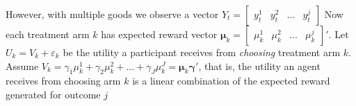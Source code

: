 \documentclass{article}
\begin{document}
However, with multiple goods we observe a  vector  $Y_t = \begin{bmatrix} y^1_t & y^2_t & ... & y^j_t\end{bmatrix}$
Now each treatment arm $k$ has expected reward vector $\bm{\mu}_k = \begin{bmatrix}
    \mu^1_k & \mu^2_k & ... & \mu^j_k
\end{bmatrix}'$. Let $U_k = V_k + \varepsilon_k$ be the utility a 
participant receives from \textit{choosing} treatment arm $k$. Assume $V_k = 
\gamma_1 \mu^1_k + \gamma_2 \mu^2_k + ... + \gamma_J \mu^J_k = \bm{\mu}_k\bm{\gamma}'$, that is, the utility 
an agent receives from choosing arm $k$ is a linear combination of the expected 
reward generated for outcome $j$
\end{document}
